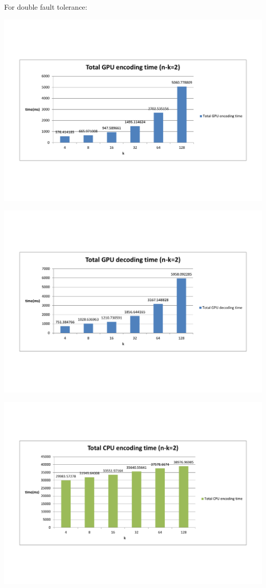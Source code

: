 \documentclass[a4paper]{article}
\begin{document}
For double fault tolerance:

\includegraphics[scale=0.5]{result-graph/Total-GPU-encoding-time-2.pdf}

\includegraphics[scale=0.5]{result-graph/Total-GPU-decoding-time-2.pdf}

\includegraphics[scale=0.5]{result-graph/Total-CPU-encoding-time-2.pdf}
\end{document}
